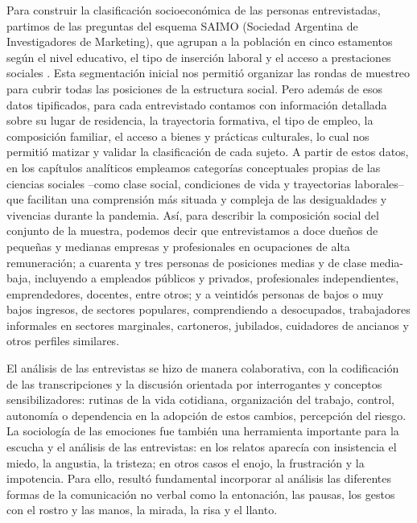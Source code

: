 \begin{refsection}
Para construir la clasificación socioeconómica de las personas entrevistadas, partimos de las preguntas del esquema SAIMO (Sociedad Argentina de Investigadores de Marketing), que agrupan a la población en cinco estamentos según el nivel educativo, el tipo de inserción laboral y el acceso a prestaciones sociales \protect\parencite{4185-CLEMENCEAU2016}. Esta segmentación inicial nos permitió organizar las rondas de muestreo para cubrir todas las posiciones de la estructura social. Pero además de esos datos tipificados, para cada entrevistado contamos con información detallada sobre su lugar de residencia, la trayectoria formativa, el tipo de empleo, la composición familiar, el acceso a bienes y prácticas culturales, lo cual nos permitió matizar y validar la clasificación de cada sujeto. A partir de estos datos, en los capítulos analíticos empleamos categorías conceptuales propias de las ciencias sociales –como clase social, condiciones de vida y trayectorias laborales– que facilitan una comprensión más situada y compleja de las desigualdades y vivencias durante la pandemia. Así, para describir la composición social del conjunto de la muestra, podemos decir que entrevistamos a doce dueños de pequeñas y medianas empresas y profesionales en ocupaciones de alta remuneración; a cuarenta y tres personas de posiciones medias y de clase media-baja, incluyendo a empleados públicos y privados, profesionales independientes, emprendedores, docentes, entre otros; y a veintidós personas de bajos o muy bajos ingresos, de sectores populares, comprendiendo a desocupados, trabajadores informales en sectores marginales, cartoneros, jubilados, cuidadores de ancianos y otros perfiles similares.

El análisis de las entrevistas se hizo de manera colaborativa, con la codificación de las transcripciones y la discusión orientada por interrogantes y conceptos sensibilizadores: rutinas de la vida cotidiana, organización del trabajo, control, autonomía o dependencia en la adopción de estos cambios, percepción del riesgo. La sociología de las emociones fue también una herramienta importante para la escucha y el análisis de las entrevistas: en los relatos aparecía con insistencia el miedo, la angustia, la tristeza; en otros casos el enojo, la frustración y la impotencia. Para ello, resultó fundamental incorporar al análisis las diferentes formas de la comunicación no verbal como la entonación, las pausas, los gestos con el rostro y las manos, la mirada, la risa y el llanto.



\end{refsection}
